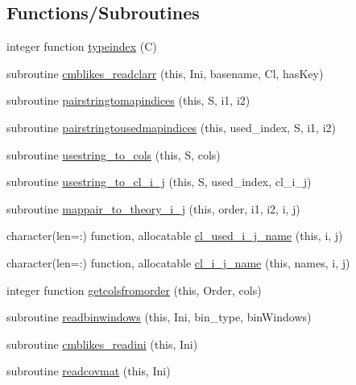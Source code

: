 \subsection*{Functions/\+Subroutines}
\begin{DoxyCompactItemize}
\item 
integer function \mbox{\hyperlink{namespacecmblikes_a957c1b188c2225799d8fb439858c73d6}{typeindex}} (C)
\item 
subroutine \mbox{\hyperlink{namespacecmblikes_ae22eb6439b51b993d560298fa0c2ebd8}{cmblikes\+\_\+readclarr}} (this, Ini, basename, Cl, has\+Key)
\item 
subroutine \mbox{\hyperlink{namespacecmblikes_a41e3ac813ae7de0d8a76ffdd669077f1}{pairstringtomapindices}} (this, S, i1, i2)
\item 
subroutine \mbox{\hyperlink{namespacecmblikes_af5bfde8e9716fa2038de9aec00e88699}{pairstringtousedmapindices}} (this, used\+\_\+index, S, i1, i2)
\item 
subroutine \mbox{\hyperlink{namespacecmblikes_a6ccd97b88f377eae282aaa60c1661b49}{usestring\+\_\+to\+\_\+cols}} (this, S, cols)
\item 
subroutine \mbox{\hyperlink{namespacecmblikes_aacd5ae93afb3acb0e509842bbfeb7e4e}{usestring\+\_\+to\+\_\+cl\+\_\+i\+\_\+j}} (this, S, used\+\_\+index, cl\+\_\+i\+\_\+j)
\item 
subroutine \mbox{\hyperlink{namespacecmblikes_a160df8f7d35a11fb589fee16adc7675b}{mappair\+\_\+to\+\_\+theory\+\_\+i\+\_\+j}} (this, order, i1, i2, i, j)
\item 
character(len=\+:) function, allocatable \mbox{\hyperlink{namespacecmblikes_aed345a121b78d08d7aa703636785f56b}{cl\+\_\+used\+\_\+i\+\_\+j\+\_\+name}} (this, i, j)
\item 
character(len=\+:) function, allocatable \mbox{\hyperlink{namespacecmblikes_a44a1c6a75608d89a037ffc9ea4571aa3}{cl\+\_\+i\+\_\+j\+\_\+name}} (this, names, i, j)
\item 
integer function \mbox{\hyperlink{namespacecmblikes_a114579c77c600f40b2354a47106bde81}{getcolsfromorder}} (this, Order, cols)
\item 
subroutine \mbox{\hyperlink{namespacecmblikes_a44827afcb3b8cf727e566cb8919f7e0e}{readbinwindows}} (this, Ini, bin\+\_\+type, bin\+Windows)
\item 
subroutine \mbox{\hyperlink{namespacecmblikes_a0a856ee69d8586f1b224e56f86016346}{cmblikes\+\_\+readini}} (this, Ini)
\item 
subroutine \mbox{\hyperlink{namespacecmblikes_a53d98d3cf4a8d20dca8c46be7bd33329}{readcovmat}} (this, Ini)

\end{DoxyCompactItemize}
